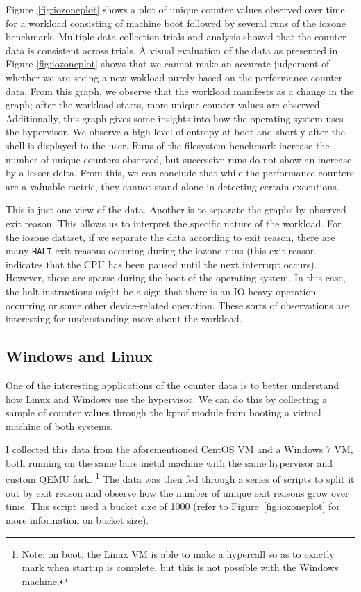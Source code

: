 \documentclass[notitlepage]{article}
\begin{document}
Figure~\ref{fig:iozoneplot} shows a plot of unique counter values observed over
time for a workload consisting of machine boot followed by several runs of the
iozone benchmark. Multiple data collection trials and analysis showed that the
counter data is consistent across trials. A visual evaluation of the data as
presented in Figure \ref{fig:iozoneplot} shows that we cannot make an accurate
judgement of whether we are seeing a new wokload purely based on the performance
counter data. From this graph, we observe that the workload manifests as a
change in the graph; after the workload starts, more unique counter values are
observed.  Additionally, this graph gives some insights into how the operating
system uses the hypervisor. We observe a high level of entropy at boot and
shortly after the shell is displayed to the user. Runs of the filesystem
benchmark increase the number of unique counters observed, but successive runs
do not show an increase by a lesser delta. From this, we can conclude that while
the performance counters are a valuable metric, they cannot stand alone in
detecting certain executions.

This is just one view of the data. Another is to separate the graphs by observed
exit reason. This allows us to interpret the specific nature of the workload.
For the iozone dataset, if we separate the data according to exit reason, there
are many \texttt{HALT} exit reasons occuring during the iozone runs (this exit
reason indicates that the CPU has been paused until the next interrupt occurs).
However, these are sparse during the boot of the operating system. In this case,
the halt instructions might be a sign that there is an IO-heavy operation
occurring or some other device-related operation. These sorts of observations
are interesting for understanding more about the workload.

\subsection{Windows and Linux}
One of the interesting applications of the counter data is to better understand
how Linux and Windows use the hypervisor. We can do this by collecting a sample
of counter values through the kprof module from booting a virtual machine of
both systems.

I collected this data from the aforementioned CentOS VM and a Windows 7 VM, both
running on the same bare metal machine with the same hypervisor and custom QEMU
fork. \footnote{Note: on boot, the Linux VM is able to make a hypercall so as to
    exactly mark when startup is complete, but this is not possible with the
Windows machine.} The data was then fed through a series of scripts to split it
out by exit reason and observe how the number of unique exit reasons grow over
time. This script used a bucket size of 1000 (refer to
Figure~\ref{fig:iozoneplot} for more information on bucket size).
\end{document}
